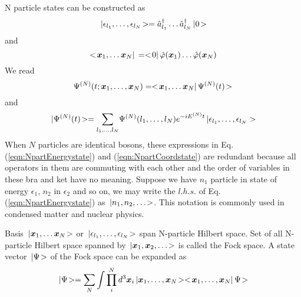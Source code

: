  N particle states can be constructed as
 \begin{equation}
 \,| \epsilon_{l_1}, \dots, \epsilon_{l_N} \!>
 =
 \hat{a}_{l_1}^\dagger \dots  \hat{a}_{l_N}^\dagger \,| 0 \!>
 \label{eqn:NpartEnergystate}
 \end{equation}
 and
 \begin{equation}
<\! \mbox{\boldmath $x$}_1, \dots  \mbox{\boldmath $x$}_N |\,
= <\! 0 |\,
\hat{\varphi}(\mbox{\boldmath $x$}_1) \dots \hat{\varphi}(\mbox{\boldmath $x$}_N)
\label{eqn:NpartCoordstate}
\end{equation}
We read
\begin{equation}
\Psi^{(N)}(t; \mbox{\boldmath $x$}_1, \dots, \mbox{\boldmath $x$}_N)
= <\! \mbox{\boldmath $x$}_1, \dots  \mbox{\boldmath $x$}_N |\, \Psi^{(N)}(t) \!>
\end{equation}
and 
\begin{equation}
\,| \Psi^{(N)}(t) \!>
=
{\mathop{\displaystyle \sum}_{\scriptstyle {l_1},  \dots, {l_N} } }
\Psi^{(N)}(l_1,\dots, l_N)
e^{-i E^{(N)} t}
\,|
\epsilon_{l_1}, \dots, \epsilon_{l_N} >
\end{equation}
When $N$ particles are identical bosons,
these expressions in Eq. (\ref{eqn:NpartEnergystate}) and (\ref{eqn:NpartCoordstate})
are redundant because all operators in them are commuting with each other
and the order of variables in these bra and ket have no meaning.
Suppose we have $n_1$ particle in state of energy $\epsilon_1$, $n_2$ in $\epsilon_2$ 
and so on, we may write the $l.h.s.$ of Eq. (\ref{eqn:NpartEnergystate}) as
$\,| n_1, n_2, \dots \!>$. This notation is commonly used in condensed matter
and nuclear physics.

Basis $\,| \mbox{\boldmath $x$}_1, \dots  \mbox{\boldmath $x$}_N \!>$ or 
$\,| \epsilon_{l_1}, \dots, \epsilon_{l_N} \!>$ 
span N-particle Hilbert space. Set of all N-particle
Hilbert space spanned by $\,| \mbox{\boldmath $x$}_1, \mbox{\boldmath $x$}_2, \dots   \!>$
is called the Fock space.
A state vector $\,| \Psi \!>$ of the Fock space can be
expanded as
\begin{equation}
\,| \Psi \!> =
\sum_N \int \prod_i^N d^3 \mbox{\boldmath $x$}_i \,| \mbox{\boldmath $x$}_1, \dots,  \mbox{\boldmath $x$}_N \!>
<\! \mbox{\boldmath $x$}_1, \dots,  \mbox{\boldmath $x$}_N |\, \Psi \!>
\end{equation}


\begin{comment}
\bigskip

\bigskip

\bigskip

\begin{equation}
\ketend p_1, p_2, \dots, p_n \ket
= \{a^\dagger(p_1) a^\dagger(p_2) \dots a^\dagger(p_n)\}
\ketend 0 \ket
\end{equation}
\end{comment}